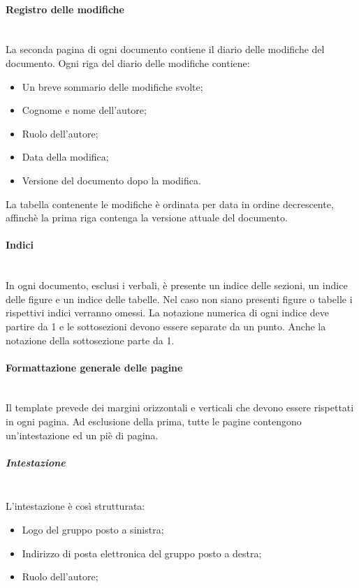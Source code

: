 		\paragraph{Registro delle modifiche} \mbox{} \\
		La seconda pagina di ogni documento contiene il diario delle modifiche del documento.
		Ogni riga del diario delle modifiche contiene:
		\begin{itemize}
			\item Un breve sommario delle modifiche svolte;
			\item Cognome e nome dell’autore;
			\item Ruolo dell’autore;
			\item Data della modifica;
			\item Versione del documento dopo la modifica.
		\end{itemize}
		La tabella contenente le modifiche è ordinata per data in ordine decrescente, affinchè la prima riga contenga la versione attuale del documento.
		
		\paragraph{Indici} \mbox{} \\
		In ogni documento, esclusi i verbali, è presente un indice delle sezioni, un indice delle figure e un indice delle tabelle. Nel caso non siano presenti figure o tabelle i rispettivi indici verranno omessi. La notazione numerica di ogni indice deve partire da 1 e le sottosezioni devono essere separate da un punto. Anche la notazione della sottosezione parte da 1.
		
		\paragraph{Formattazione generale delle pagine} \mbox{} \\
		Il template prevede dei margini orizzontali e verticali che devono essere rispettati in ogni pagina. Ad esclusione della prima, tutte le pagine contengono un’intestazione ed un piè di pagina. 
			
			\subparagraph{Intestazione} \mbox{} \\
			L’intestazione è così strutturata:
			\begin{itemize}
				\item Logo del gruppo posto a sinistra;
				\item Indirizzo di posta elettronica del gruppo posto a destra;
				\item Ruolo dell’autore;
			\end{itemize}
			
